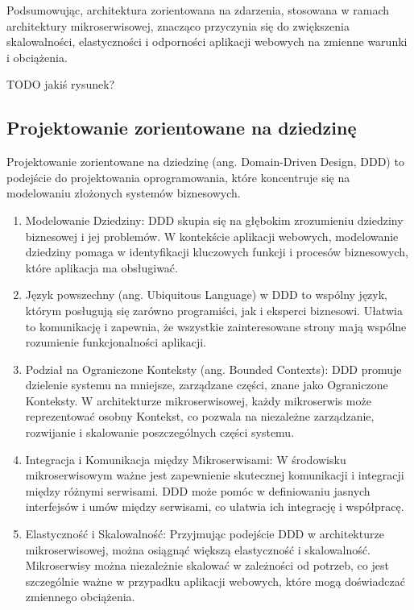 Podsumowując, architektura zorientowana na zdarzenia, stosowana w ramach architektury mikroserwisowej, znacząco przyczynia się do zwiększenia skalowalności, elastyczności i odporności aplikacji webowych na zmienne warunki i obciążenia.

TODO jakiś rysunek?

\subsection{Projektowanie zorientowane na dziedzinę}

Projektowanie zorientowane na dziedzinę (ang. Domain-Driven Design, DDD) to podejście do projektowania oprogramowania, które koncentruje się na modelowaniu złożonych systemów biznesowych.

\begin{enumerate}
    \item Modelowanie Dziedziny: DDD skupia się na głębokim zrozumieniu dziedziny biznesowej i jej problemów. W kontekście aplikacji webowych, modelowanie dziedziny pomaga w identyfikacji kluczowych funkcji i procesów biznesowych, które aplikacja ma obsługiwać.

    \item Język powszechny (ang. Ubiquitous Language) w DDD to wspólny język, którym posługują się zarówno programiści, jak i eksperci biznesowi. Ułatwia to komunikację i zapewnia, że wszystkie zainteresowane strony mają wspólne rozumienie funkcjonalności aplikacji.

    \item Podział na Ograniczone Konteksty (ang. Bounded Contexts): DDD promuje dzielenie systemu na mniejsze, zarządzane części, znane jako Ograniczone Konteksty. W architekturze mikroserwisowej, każdy mikroserwis może reprezentować osobny Kontekst, co pozwala na niezależne zarządzanie, rozwijanie i skalowanie poszczególnych części systemu.

    \item Integracja i Komunikacja między Mikroserwisami: W środowisku mikroserwisowym ważne jest zapewnienie skutecznej komunikacji i integracji między różnymi serwisami. DDD może pomóc w definiowaniu jasnych interfejsów i umów między serwisami, co ułatwia ich integrację i współpracę.

    \item Elastyczność i Skalowalność: Przyjmując podejście DDD w architekturze mikroserwisowej, można osiągnąć większą elastyczność i skalowalność. Mikroserwisy można niezależnie skalować w zależności od potrzeb, co jest szczególnie ważne w przypadku aplikacji webowych, które mogą doświadczać zmiennego obciążenia.


\end{enumerate}
